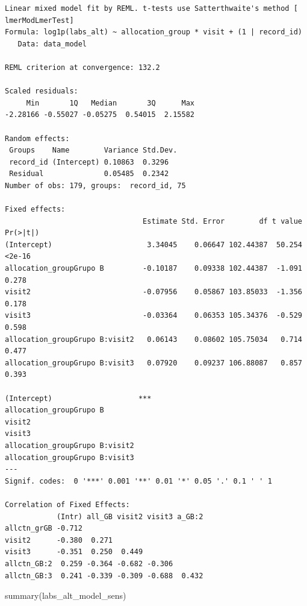 \documentclass[
  letterpaper,
  DIV=11,
  numbers=noendperiod]{scrartcl}
\newenvironment{Shaded}{\begin{snugshade}}{\end{snugshade}}
\newcommand{\FunctionTok}[1]{\textcolor[rgb]{0.28,0.35,0.67}{#1}}
\newcommand{\NormalTok}[1]{\textcolor[rgb]{0.00,0.23,0.31}{#1}}
\begin{document}
\begin{verbatim}
Linear mixed model fit by REML. t-tests use Satterthwaite's method [
lmerModLmerTest]
Formula: log1p(labs_alt) ~ allocation_group * visit + (1 | record_id)
   Data: data_model

REML criterion at convergence: 132.2

Scaled residuals: 
     Min       1Q   Median       3Q      Max 
-2.28166 -0.55027 -0.05275  0.54015  2.15582 

Random effects:
 Groups    Name        Variance Std.Dev.
 record_id (Intercept) 0.10863  0.3296  
 Residual              0.05485  0.2342  
Number of obs: 179, groups:  record_id, 75

Fixed effects:
                                Estimate Std. Error        df t value Pr(>|t|)
(Intercept)                      3.34045    0.06647 102.44387  50.254   <2e-16
allocation_groupGrupo B         -0.10187    0.09338 102.44387  -1.091    0.278
visit2                          -0.07956    0.05867 103.85033  -1.356    0.178
visit3                          -0.03364    0.06353 105.34376  -0.529    0.598
allocation_groupGrupo B:visit2   0.06143    0.08602 105.75034   0.714    0.477
allocation_groupGrupo B:visit3   0.07920    0.09237 106.88087   0.857    0.393
                                  
(Intercept)                    ***
allocation_groupGrupo B           
visit2                            
visit3                            
allocation_groupGrupo B:visit2    
allocation_groupGrupo B:visit3    
---
Signif. codes:  0 '***' 0.001 '**' 0.01 '*' 0.05 '.' 0.1 ' ' 1

Correlation of Fixed Effects:
            (Intr) all_GB visit2 visit3 a_GB:2
allctn_grGB -0.712                            
visit2      -0.380  0.271                     
visit3      -0.351  0.250  0.449              
allctn_GB:2  0.259 -0.364 -0.682 -0.306       
allctn_GB:3  0.241 -0.339 -0.309 -0.688  0.432
\end{verbatim}

\begin{Shaded}
\begin{Highlighting}[]
\FunctionTok{summary}\NormalTok{(labs\_alt\_model\_sens)}
\end{Highlighting}
\end{Shaded}
\end{document}
